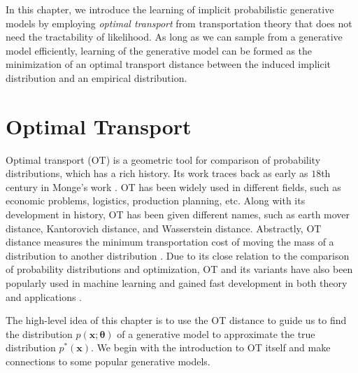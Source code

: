 In this chapter, we introduce the learning of implicit probabilistic generative models by employing \textit{optimal transport} from transportation theory that does not need the tractability of likelihood. As long as we can sample from a generative model efficiently, learning of the generative model can be formed as the minimization of an optimal transport distance between the induced implicit distribution and an empirical distribution.

\section{Optimal Transport}\label{chpt8:sec:ot}
Optimal transport (OT) is a geometric tool for comparison of probability distributions, which has a rich history. Its work traces back as early as $18$th century in Monge's work \cite{monge1781memoire}. OT has been widely used in different fields, such as economic problems, logistics, production planning, etc. Along with its development in history, OT has been given different names, such as earth mover distance, Kantorovich distance, and Wasserstein distance. Abstractly, OT distance measures the minimum transportation cost of moving the mass of a distribution to another distribution \cite{villani2003topics}. Due to its close relation to the comparison of probability distributions and optimization, OT and its
variants have also been popularly used in machine learning and gained fast development in both theory and applications \cite{2013arXiv1310.4375C, 2013arXiv1306.0895C, 2016arXiv161006519S, ClaiciCS18}.

The high-level idea of this chapter is to use the OT distance to guide us to find the distribution $p(\bm{x}; \bm{\theta})$ of a generative model to approximate the true distribution $p^{\ast}(\bm{x})$. We begin with the introduction to OT itself and make connections to some popular generative models.

